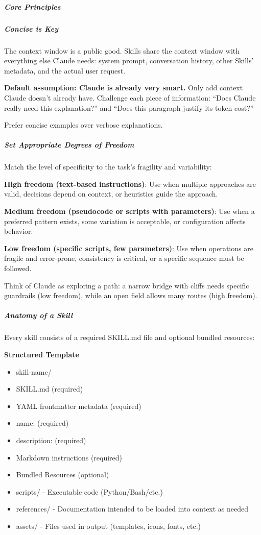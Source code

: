 \documentclass[11pt]{article}
\begin{document}
\subparagraph{Core Principles}\mbox{}\par

\subparagraph{Concise is Key}\mbox{}\par

The context window is a public good. Skills share the context window with everything else Claude needs: system prompt, conversation history, other Skills' metadata, and the actual user request.


\textbf{Default assumption: Claude is already very smart.} Only add context Claude doesn't already have. Challenge each piece of information: ``Does Claude really need this explanation?'' and ``Does this paragraph justify its token cost?''


Prefer concise examples over verbose explanations.


\subparagraph{Set Appropriate Degrees of Freedom}\mbox{}\par

Match the level of specificity to the task's fragility and variability:


\textbf{High freedom (text-based instructions)}: Use when multiple approaches are valid, decisions depend on context, or heuristics guide the approach.


\textbf{Medium freedom (pseudocode or scripts with parameters)}: Use when a preferred pattern exists, some variation is acceptable, or configuration affects behavior.


\textbf{Low freedom (specific scripts, few parameters)}: Use when operations are fragile and error-prone, consistency is critical, or a specific sequence must be followed.


Think of Claude as exploring a path: a narrow bridge with cliffs needs specific guardrails (low freedom), while an open field allows many routes (high freedom).


\subparagraph{Anatomy of a Skill}\mbox{}\par

Every skill consists of a required SKILL.md file and optional bundled resources:


\textbf{Structured Template}
\begin{itemize}[leftmargin=*,itemsep=2pt,topsep=2pt]
\item {} skill-name/
\item {} SKILL.md (required)
\item {} YAML frontmatter metadata (required)
\item {} name: (required)
\item {} description: (required)
\item {} Markdown instructions (required)
\item {} Bundled Resources (optional)
\item {} scripts/ - Executable code (Python/Bash/etc.)
\item {} references/ - Documentation intended to be loaded into context as needed
\item {} assets/ - Files used in output (templates, icons, fonts, etc.)
\end{itemize}
\end{document}
